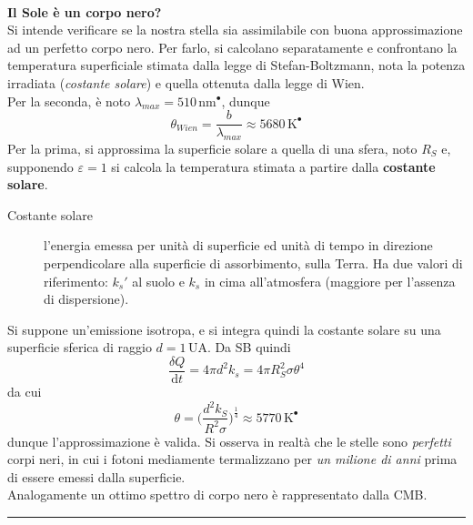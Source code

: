 \documentclass[10pt, oneside]{book}
\newcommand{\kelvin}[1]{\, \mathrm{K^{#1}}}
\newcommand{\meters}[2]{\, \mathrm{#1 m^{#2}}}
\newcommand{\infobox}[2]{\vspace{0.5cm}~\\ \textbf{#1} \hrulefill \vspace{0.2cm}\\#2 {}\,\\\hrule \vspace{0.5cm}}
\begin{document}
\infobox{Il Sole è un corpo nero?}{Si intende verificare se la nostra stella sia assimilabile con buona approssimazione ad un perfetto corpo nero. Per farlo, si calcolano separatamente e confrontano la temperatura superficiale stimata dalla legge di Stefan-Boltzmann, nota la potenza irradiata (\textit{costante solare}) e quella ottenuta dalla legge di Wien.\\
Per la seconda, è noto $\lambda_{max} = 510 \meters{n}{•}$, dunque 
\[\theta_{Wien} = \frac{b}{\lambda_{max}} \approx 5680 \kelvin{•}\]
Per la prima, si approssima la superficie solare a quella di una sfera, noto $R_S$ e, supponendo $\varepsilon = 1$ si calcola la temperatura stimata a partire dalla \textbf{costante solare}.\\
\begin{description}
\item[Costante solare] l'energia emessa per unità di superficie ed unità di tempo
in direzione perpendicolare alla superficie di assorbimento, sulla Terra. Ha due valori di riferimento: $k_s'$ al suolo e $k_s$ in cima all'atmosfera (maggiore per l'assenza di dispersione).
\end{description}
Si suppone un'emissione isotropa, e si integra quindi la costante solare su una superficie sferica di raggio $d = 1 \, \mathrm{UA}$. Da SB quindi
\[\frac{\delta Q}{\mathrm{d} t} = 4 \pi d^2 k_s = 4 \pi R_S^2 \sigma \theta^4\]
da cui
\[\theta = \bigg(\frac{d^2 k_S}{R^2 \sigma}\bigg)^{\frac{1}{4}} \approx 5770 \kelvin{•}\]
dunque l'approssimazione è valida. Si osserva in realtà che le stelle sono \textit{perfetti} corpi neri, in cui i fotoni mediamente termalizzano per \textit{un milione di anni} prima di essere emessi dalla superficie.\\
Analogamente un ottimo spettro di corpo nero è rappresentato dalla CMB.
}
\end{document}
